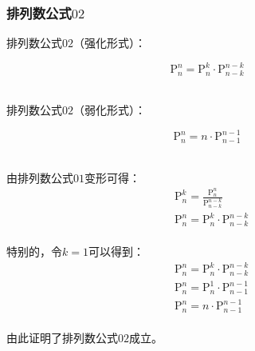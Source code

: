 \documentclass[UTF8]{ctexart}
\newcommand{\Pe}{\mathrm{P}}
\begin{document}
\subsubsection{排列数公式$02$}
    排列数公式$02$（强化形式）：
    \begin{large}
        \begin{equation*}
            \Pe_n^n=\Pe_n^k\cdot\Pe_{n-k}^{n-k}
        \end{equation*}
    \end{large}\\
    排列数公式$02$（弱化形式）：
    \begin{large}
        \begin{equation*}
            \Pe_n^n=n\cdot\Pe_{n-1}^{n-1}
        \end{equation*}
    \end{large}\\
    由排列数公式$01$变形可得：
    \setcounter{equation}{0}
    \begin{align}
        &\Pe_n^k=\frac{\Pe_n^n}{\Pe_{n-k}^{n-k}}\\[3mm]
        &\Pe_n^n=\Pe_n^k\cdot\Pe_{n-k}^{n-k}
    \end{align}\\
    特别的，令$k=1$可以得到：
    \begin{align}
        &\Pe_n^n=\Pe_n^k\cdot\Pe_{n-k}^{n-k}\\[3mm]
        &\Pe_n^n=\Pe_n^1\cdot\Pe_{n-1}^{n-1}\\[3mm]
        &\Pe_n^n=n\cdot\Pe_{n-1}^{n-1}
    \end{align}\\
    由此证明了排列数公式$02$成立。

\newpage
\end{document}
